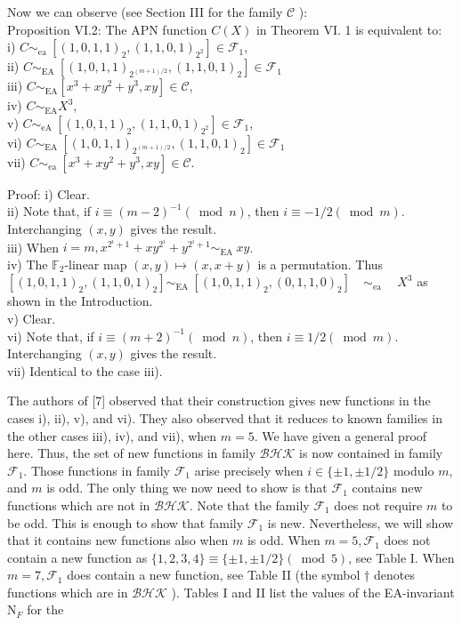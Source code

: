 \documentclass[10pt]{article}
\begin{document}
Now we can observe (see Section III for the family $\mathcal{C}$ ):\\
Proposition VI.2: The APN function $C(X)$ in Theorem VI. 1 is equivalent to:\\
i) $C \sim_{\text {ea }}\left[(1,0,1,1)_{2},(1,1,0,1)_{2^{2}}\right] \in \mathcal{F}_{1}$,\\
ii) $C \sim_{\text {EA }}\left[(1,0,1,1)_{2^{(m+1) / 2}},(1,1,0,1)_{2}\right] \in \mathcal{F}_{1}$\\
iii) $C \sim_{\mathrm{EA}}\left[x^{3}+x y^{2}+y^{3}, x y\right] \in \mathcal{C}$,\\
iv) $C \sim_{\mathrm{EA}} X^{3}$,\\
v) $C \sim_{\text {eA }}\left[(1,0,1,1)_{2},(1,1,0,1)_{2^{2}}\right] \in \mathcal{F}_{1}$,\\
vi) $C \sim_{\text {EA }}\left[(1,0,1,1)_{2^{(m+1) / 2}},(1,1,0,1)_{2}\right] \in \mathcal{F}_{1}$\\
vii) $C \sim_{\text {ea }}\left[x^{3}+x y^{2}+y^{3}, x y\right] \in \mathcal{C}$.

Proof: i) Clear.\\
ii) Note that, if $i \equiv(m-2)^{-1}(\bmod n)$, then $i \equiv-1 / 2 (\bmod m)$. Interchanging $(x, y)$ gives the result.\\
iii) When $i=m, x^{2^{i}+1}+x y^{2^{i}}+y^{2^{i}+1} \sim_{\text {EA }} x y$.\\
iv) The $\mathbb{F}_{2}$-linear map $(x, y) \mapsto(x, x+y)$ is a permutation. Thus $\left[(1,0,1,1)_{2},(1,1,0,1)_{2}\right] \sim_{\text {EA }} \left[(1,0,1,1)_{2},(0,1,1,0)_{2}\right] \quad \sim_{\text {ea }} \quad X^{3}$ as shown in the Introduction.\\
v) Clear.\\
vi) Note that, if $i \equiv(m+2)^{-1}(\bmod n)$, then $i \equiv 1 / 2 (\bmod m)$. Interchanging $(x, y)$ gives the result.\\
vii) Identical to the case iii).

The authors of [7] observed that their construction gives new functions in the cases i), ii), v), and vi). They also observed that it reduces to known families in the other cases iii), iv), and vii), when $m=5$. We have given a general proof here. Thus, the set of new functions in family $\mathcal{B} \mathcal{H} \mathcal{K}$ is now contained in family $\mathcal{F}_{1}$. Those functions in family $\mathcal{F}_{1}$ arise precisely when $i \in\{ \pm 1, \pm 1 / 2\}$ modulo $m$, and $m$ is odd. The only thing we now need to show is that $\mathcal{F}_{1}$ contains new functions which are not in $\mathcal{B} \mathcal{H} \mathcal{K}$. Note that the family $\mathcal{F}_{1}$ does not require $m$ to be odd. This is enough to show that family $\mathcal{F}_{1}$ is new. Nevertheless, we will show that it contains new functions also when $m$ is odd. When $m=5, \mathcal{F}_{1}$ does not contain a new function as $\{1,2,3,4\} \equiv\{ \pm 1, \pm 1 / 2\}(\bmod 5)$, see Table I. When $m=7, \mathcal{F}_{1}$ does contain a new function, see Table II (the symbol † denotes functions which are in $\mathcal{B} \mathcal{H} \mathcal{K}$ ). Tables I and II list the values of the EA-invariant $\mathrm{N}_{F}$ for the
\end{document}
